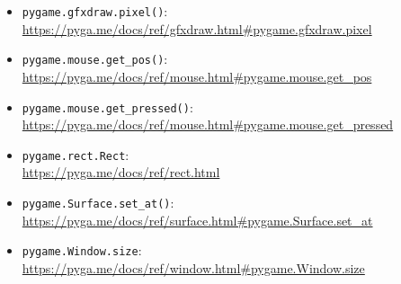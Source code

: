 \begin{itemize}

	\item \texttt{pygame.gfxdraw.pixel()}:
    \\ \url{https://pyga.me/docs/ref/gfxdraw.html#pygame.gfxdraw.pixel}

	\item \texttt{pygame.mouse.get\_pos()}:
	\\
	\url{https://pyga.me/docs/ref/mouse.html#pygame.mouse.get_pos}

	\item \texttt{pygame.mouse.get\_pressed()}:
	\\
	\url{https://pyga.me/docs/ref/mouse.html#pygame.mouse.get_pressed}

	\item \texttt{pygame.rect.Rect}:
    \\
    \url{https://pyga.me/docs/ref/rect.html}
	
	\item \texttt{pygame.Surface.set\_at()}:
	\\
	\url{https://pyga.me/docs/ref/surface.html#pygame.Surface.set_at}
	
	\item \texttt{pygame.Window.size}:
	\\
	\url{https://pyga.me/docs/ref/window.html#pygame.Window.size}

\end{itemize}


